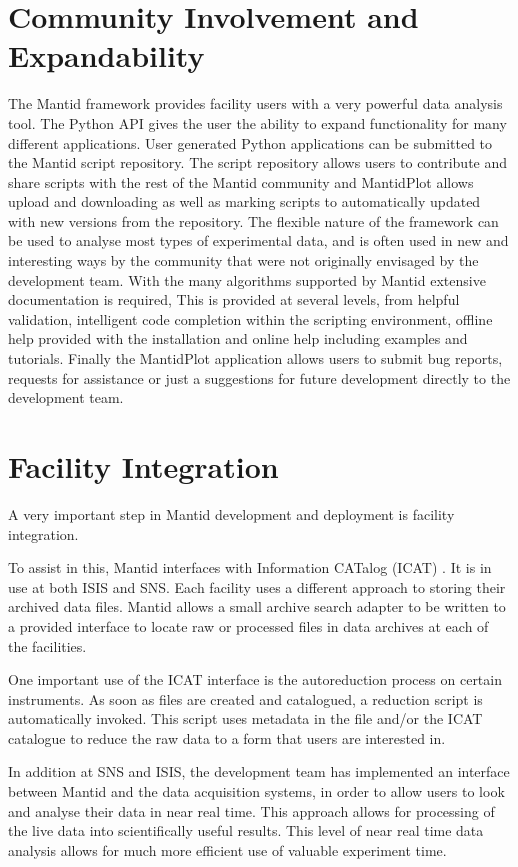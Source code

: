 \documentclass[1p]{elsarticle}
\begin{document}
\section{Community Involvement and Expandability}
The Mantid framework provides facility users with a very powerful data analysis tool. The Python API gives the user the ability to expand functionality for many different applications. User generated Python applications can be submitted to the Mantid script repository. The script repository  allows users to contribute and share scripts with the rest of the Mantid community and MantidPlot allows upload and downloading as well as marking scripts to automatically updated with new versions from the  repository. The flexible nature of the framework can be used to analyse most types of experimental data, and is often used in new and interesting ways by the community that were not originally envisaged by the development team.
With the many algorithms supported by Mantid extensive documentation is required,  This is provided at several levels, from helpful validation, intelligent code completion within the scripting environment, offline help provided with the installation and online help including examples and tutorials.
Finally the MantidPlot application allows users to submit bug reports, requests for assistance or just a suggestions for future development directly to the development team.

\section{Facility Integration}
A very important step in Mantid development and deployment is facility integration.

To assist in this, Mantid interfaces with Information CATalog (ICAT) \cite{ICAT}. 
It is in use at both ISIS and SNS. Each facility uses a different approach to storing their archived data files. Mantid allows a small archive search adapter to be written to a provided interface to locate raw or processed files in data archives at each of the facilities.

One important use of the ICAT interface is the autoreduction process on certain instruments. As soon as files are created and catalogued, a reduction script is automatically invoked. This script uses metadata in the file and/or the ICAT catalogue to reduce the raw data to a form that users are interested in. 

In addition at SNS and ISIS, the development team has implemented an interface between Mantid and the data acquisition systems, in order to allow users to look and analyse their data in near real time. This approach allows for processing of the live data into scientifically useful results. This level of near real time data analysis allows for much more efficient use of valuable experiment time.  
\end{document}
